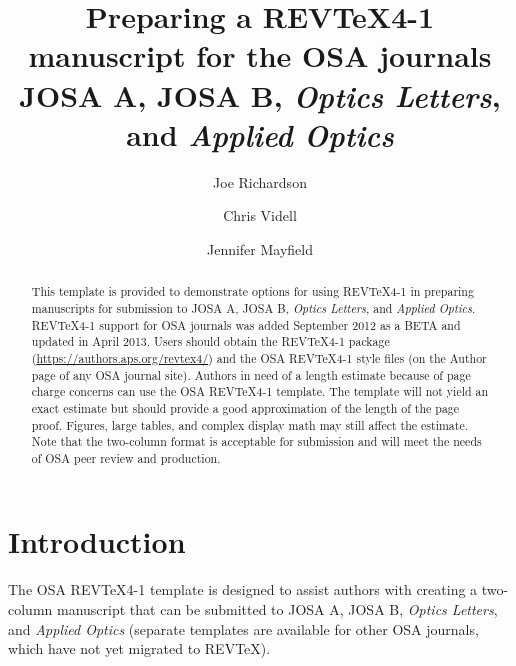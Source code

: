 \documentclass[osajnl,twocolumn,showpacs,superscriptaddress,10pt]{revtex4-1} %
\begin{document}
\title{Preparing a REV\TeX{}4-1 manuscript
for the OSA journals \\ JOSA A, JOSA B, \textit{Optics Letters}, and
\textit{Applied Optics} }

\author{Joe Richardson}

\author{Chris Videll}
\author{Jennifer Mayfield}



\begin{abstract}This template is provided to demonstrate options
for using REV\TeX{}4-1 in preparing manuscripts for submission to
JOSA A, JOSA B, \textit{Optics Letters}, and \textit{Applied Optics}. REV\TeX{}4-1 support
for OSA journals was added September 2012 as a BETA and updated in April 2013. Users should obtain the
REV\TeX{}4-1 package (\url{https://authors.aps.org/revtex4/}) and the OSA REV\TeX{}4-1 style files  (on the Author page of any OSA journal site). Authors in need of a length estimate because of page charge concerns can use the OSA REV\TeX{}4-1 template. The template will not yield an exact estimate but should provide a good approximation of the length of the page proof. Figures, large tables, and complex display math may still affect the estimate. Note that the two-column format is acceptable for submission and will meet the needs of OSA peer review and production.
\end{abstract}


\maketitle %

\section{Introduction}


The OSA REV\TeX{}4-1 template is designed to assist authors with creating a two-column manuscript that can be submitted to JOSA A, JOSA B, \textit{Optics Letters}, and \textit{Applied Optics} (separate templates are available for other OSA journals, which have not yet migrated to REV\TeX{}).
\end{document}
